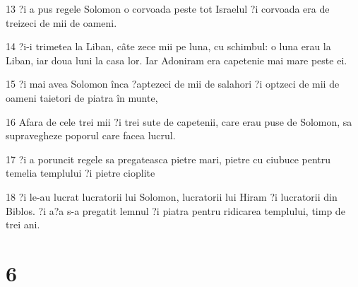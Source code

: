 \par 13 ?i a pus regele Solomon o corvoada peste tot Israelul ?i corvoada era de treizeci de mii de oameni.
\par 14 ?i-i trimetea la Liban, câte zece mii pe luna, cu schimbul: o luna erau la Liban, iar doua luni la casa lor. Iar Adoniram era capetenie mai mare peste ei.
\par 15 ?i mai avea Solomon înca ?aptezeci de mii de salahori ?i optzeci de mii de oameni taietori de piatra în munte,
\par 16 Afara de cele trei mii ?i trei sute de capetenii, care erau puse de Solomon, sa supravegheze poporul care facea lucrul.
\par 17 ?i a poruncit regele sa pregateasca pietre mari, pietre cu ciubuce pentru temelia templului ?i pietre cioplite
\par 18 ?i le-au lucrat lucratorii lui Solomon, lucratorii lui Hiram ?i lucratorii din Biblos. ?i a?a s-a pregatit lemnul ?i piatra pentru ridicarea templului, timp de trei ani.

\chapter{6}

